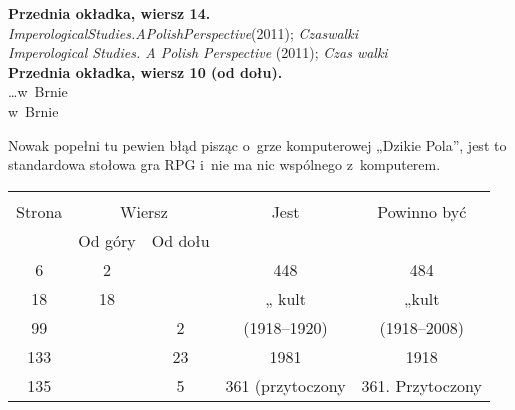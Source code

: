 \documentclass[a4paper,11pt]{article}
\begin{document}
\noindent
\textbf{Przednia okładka, wiersz 14.} \\
\Jest \textit{ImperologicalStudies.APolishPerspective}(2011);
\textit{Czaswalki} \\
\Powin \textit{Imperological Studies. A Polish Perspective} (2011);
\textit{Czas walki} \\
\textbf{Przednia okładka, wiersz 10 (od dołu).} \\
\Jest  \ldots w~Brnie \\
\Powin w~Brnie \\


\vspace{\spaceTwo}














\start \Str{} Nowak popełni tu pewien błąd pisząc o~grze komputerowej
„Dzikie Pola”, jest to standardowa stołowa gra RPG i~nie ma nic
wspólnego z~komputerem.







\begin{center}

  \begin{tabular}{|c|c|c|c|c|}
    \hline
    & \multicolumn{2}{c|}{} & & \\
    Strona & \multicolumn{2}{c|}{Wiersz} & Jest
                              & Powinno być \\ \cline{2-3}
    & Od góry & Od dołu & & \\
    \hline
    6   &  2 & & 448 & 484 \\
    18  & 18 & & „ kult & „kult \\
    99  & &  2 & (1918--1920) & (1918--2008) \\
    133 & & 23 & 1981 & 1918 \\
    135 & &  5 & 361 (przytoczony & 361. Przytoczony \\
    \hline
  \end{tabular}

\end{center}
\end{document}
